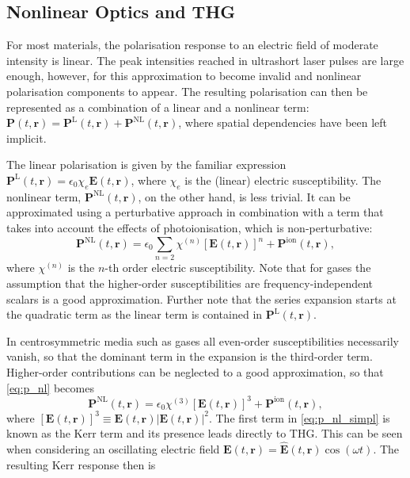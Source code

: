 \documentclass[a4paper]{jpconf}
\begin{document}
\subsection{Nonlinear Optics and THG}
For most materials, the polarisation response to an electric field of moderate intensity is linear. The peak intensities reached in ultrashort laser pulses are large enough, however, for this approximation to become invalid and nonlinear polarisation components to appear. The resulting polarisation can then be represented as a combination of a linear and a nonlinear term: $\mathbf{P}(t, \mathbf{r}) = \mathbf{P}^\text{L}(t, \mathbf{r}) + \mathbf{P}^\text{NL}(t, \mathbf{r})$, where spatial dependencies have been left implicit. \par 
The linear polarisation is given by the familiar expression $\mathbf{P}^\text{L}(t, \mathbf{r}) = \epsilon_0 \chi_e \mathbf{E}(t, \mathbf{r})$, where $\chi_e$ is the (linear) electric susceptibility. The nonlinear term, $\mathbf{P}^\text{NL}(t, \mathbf{r})$, on the other hand, is less trivial. It can be approximated using a perturbative approach in combination with a term that takes into account the effects of photoionisation, which is non-perturbative:
\begin{equation}\label{eq:p_nl}
\mathbf{P}^\text{NL}(t, \mathbf{r}) = \epsilon_0 \sum_{n=2} \chi^{(n)} [\mathbf{E}(t, \mathbf{r})]^n + \mathbf{P}^\text{ion}(t, \mathbf{r}),
\end{equation}
where $\chi^{(n)}$ is the $n$-th order electric susceptibility. Note that for gases the assumption that the higher-order susceptibilities are frequency-independent scalars is a good approximation. Further note that the series expansion starts at the quadratic term as the linear term is contained in $\mathbf{P}^\text{L}(t, \mathbf{r})$.  \par 
In centrosymmetric media such as gases all even-order susceptibilities necessarily vanish, so that the dominant term in the expansion is the third-order term. Higher-order contributions can be neglected to a good approximation, so that \eqref{eq:p_nl} becomes 
\begin{equation}\label{eq:p_nl_simpl}
\mathbf{P}^\text{NL}(t, \mathbf{r}) = \epsilon_0 \chi^{(3)} [\mathbf{E}(t, \mathbf{r})]^3 + \mathbf{P}^\text{ion}(t, \mathbf{r}),
\end{equation}
where $[\mathbf{E}(t, \mathbf{r})]^3 \equiv \mathbf{E}(t, \mathbf{r}) |\mathbf{E}(t, \mathbf{r})|^2$. 
The first term in \eqref{eq:p_nl_simpl} is known as the Kerr term and its presence leads directly to THG. This can be seen when considering an oscillating electric field $\mathbf{E}(t, \mathbf{r}) = \hat{\mathbf{E}}(t, \mathbf{r})\cos(\omega t)$. The resulting Kerr response then is 
\end{document}
